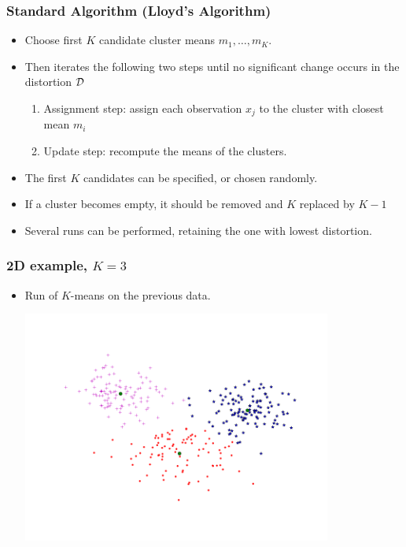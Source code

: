 \documentclass[10pt]{beamer}
\begin{document}
\begin{frame}
  \frametitle{Standard Algorithm (Lloyd's Algorithm)}
  \begin{itemize}
  \item Choose first $K$ candidate cluster means $m_1,\dots,m_K$.\vfill
  \item Then iterates the following two steps until no significant change occurs in the distortion ${\mathcal D}$\vfill
    \begin{enumerate}
    \item Assignment step: assign each observation $x_j$ to the cluster with closest mean $m_i$\vfill
    \item Update step: recompute the means of the clusters.\vfill
    \end{enumerate}
  \end{itemize}
\end{frame}

\begin{frame}
  \begin{itemize}
  \item The first $K$ candidates can be specified, or chosen randomly.
  \item If a cluster becomes empty, it should be removed and $K$ replaced by $K-1$
  \item Several runs can be performed, retaining the one with lowest distortion.
  \end{itemize}
\end{frame}

\begin{frame}
  \frametitle{2D example, $K = 3$}
  \begin{itemize}
  \item Run of $K$-means on the previous data.
    \begin{center}
      \includegraphics[width=0.8\textwidth]{FIGURES/2DData3Clusters}
    \end{center}
  \end{itemize}
\end{frame}
\end{document}
